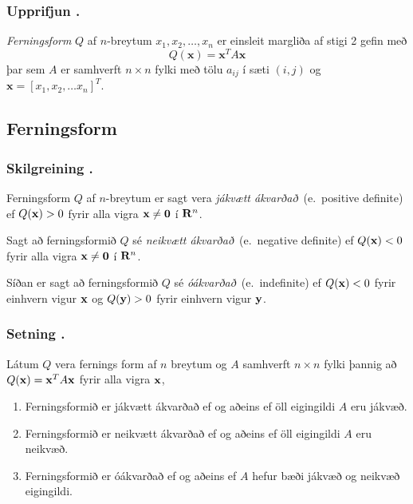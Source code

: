 \subsubsection{Upprifjun \kaflanr.}
{\em \color{red} Ferningsform} $Q$ af $n$-breytum $x_1,x_2,\ldots, x_n$ er einsleit margliða af stigi 2 gefin með 
\begin {equation*}
Q(\mathbf{x}) = \mathbf{x}^T A \mathbf{x}
\end {equation*}
þar sem $A$ er samhverft $n \times n$ fylki með tölu $a_{ij}$ í sæti $(i,j)$ og $\mathbf{x} = [x_1,x_2,\ldots x_n]^T$.







\subsection{Ferningsform} 

\subsubsection{Skilgreining \kaflanr.}
Ferningsform $Q$ af $n$-breytum er sagt vera
{\em \color{red} jákvætt ákvarðað}\  (e.~positive definite) ef $Q(\mbox{${\bf x}$})>0$ fyrir
alla vigra $\mbox{${\bf x}$}\neq \mbox{${\bf 0}$}$ í $\mbox{${\bf R}^n$}$.   

\medskip
Sagt að ferningsformið $Q$ sé
{\em \color{red} neikvætt ákvarðað}\  (e.~negative definite) ef $Q(\mbox{${\bf x}$})<0$ fyrir
alla vigra $\mbox{${\bf x}$}\neq \mbox{${\bf 0}$}$ í $\mbox{${\bf R}^n$}$.   

\medskip
Síðan er sagt að ferningsformið $Q$ sé
{\em  \color{red} óákvarðað}\  (e.~indefinite) ef $Q(\mbox{${\bf x}$})<0$ fyrir
einhvern vigur $\mbox{${\bf x}$}$  og $Q(\mbox{${\bf y}$})>0$ fyrir einhvern vigur
$\mbox{${\bf y}$}$. 




\subsubsection{Setning \kaflanr.}
 Látum $Q$ vera fernings form  af $n$ breytum og
$A$ samhverft $n\times n$ fylki þannig að $Q(\mbox{${\bf x}$})=\mbox{${\bf x}$}^TA\mbox{${\bf x}$}$ fyrir
alla vigra $\mbox{${\bf x}$}$,
\begin {enumerate}
 \item  Ferningsformið er jákvætt ákvarðað ef og aðeins ef öll eigingildi
    $A$ eru jákvæð.
\item Ferningsformið er neikvætt ákvarðað ef og aðeins ef öll eigingildi
    $A$ eru neikvæð.
\item  Ferningsformið er óákvarðað ef og aðeins ef $A$ hefur bæði jákvæð
     og neikvæð eigingildi.	
\end {enumerate}





